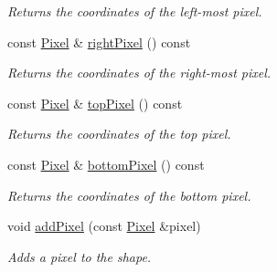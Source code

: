 \begin{CompactItemize}
\begin{CompactList}\small\item\em Returns the coordinates of the left-most pixel. \item\end{CompactList}\item 
const \hyperlink{_pixel_8hpp_535e59456e3e633842529cfa8ea103c4}{Pixel} \& \hyperlink{class_shape_c265e43fa90ee2ab7c9cd3a3d1e96d82}{rightPixel} () const 
\begin{CompactList}\small\item\em Returns the coordinates of the right-most pixel. \item\end{CompactList}\item 
const \hyperlink{_pixel_8hpp_535e59456e3e633842529cfa8ea103c4}{Pixel} \& \hyperlink{class_shape_063c4934d8c1cd4b02e4e3e4a604f62e}{topPixel} () const 
\begin{CompactList}\small\item\em Returns the coordinates of the top pixel. \item\end{CompactList}\item 
const \hyperlink{_pixel_8hpp_535e59456e3e633842529cfa8ea103c4}{Pixel} \& \hyperlink{class_shape_99293804122214fa366d7f7ae794d077}{bottomPixel} () const 
\begin{CompactList}\small\item\em Returns the coordinates of the bottom pixel. \item\end{CompactList}\item 
void \hyperlink{class_shape_f6114234203d9473f1fef9e6391f9243}{addPixel} (const \hyperlink{_pixel_8hpp_535e59456e3e633842529cfa8ea103c4}{Pixel} \&pixel)
\begin{CompactList}\small\item\em Adds a pixel to the shape. \item\end{CompactList}\end{CompactItemize}
